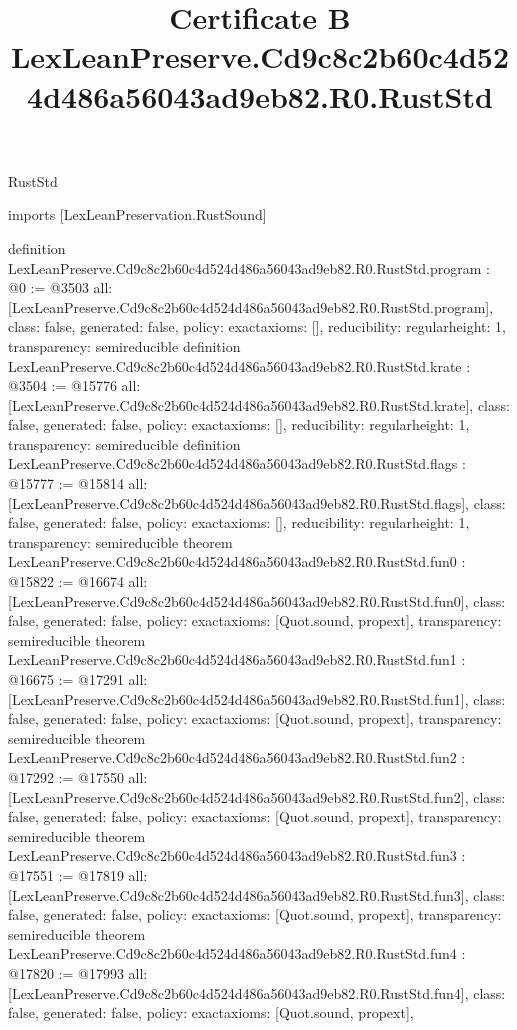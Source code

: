 \begin{lexlean}{RustStd}
\title{Certificate B LexLeanPreserve.Cd9c8c2b60c4d524d486a56043ad9eb82.R0.RustStd}
\begin{coremodule}
imports [LexLeanPreservation.RustSound]

definition LexLeanPreserve.Cd9c8c2b60c4d524d486a56043ad9eb82.R0.RustStd.program : @0 := @3503 {
  all: [LexLeanPreserve.Cd9c8c2b60c4d524d486a56043ad9eb82.R0.RustStd.program],
  class: false,
  generated: false,
  policy: exact{axioms: []},
  reducibility: regular{height: 1},
  transparency: semireducible
}
definition LexLeanPreserve.Cd9c8c2b60c4d524d486a56043ad9eb82.R0.RustStd.krate : @3504 := @15776 {
  all: [LexLeanPreserve.Cd9c8c2b60c4d524d486a56043ad9eb82.R0.RustStd.krate],
  class: false,
  generated: false,
  policy: exact{axioms: []},
  reducibility: regular{height: 1},
  transparency: semireducible
}
definition LexLeanPreserve.Cd9c8c2b60c4d524d486a56043ad9eb82.R0.RustStd.flags : @15777 := @15814 {
  all: [LexLeanPreserve.Cd9c8c2b60c4d524d486a56043ad9eb82.R0.RustStd.flags],
  class: false,
  generated: false,
  policy: exact{axioms: []},
  reducibility: regular{height: 1},
  transparency: semireducible
}
theorem LexLeanPreserve.Cd9c8c2b60c4d524d486a56043ad9eb82.R0.RustStd.fun0 : @15822 := @16674 {
  all: [LexLeanPreserve.Cd9c8c2b60c4d524d486a56043ad9eb82.R0.RustStd.fun0],
  class: false,
  generated: false,
  policy: exact{axioms: [Quot.sound, propext]},
  transparency: semireducible
}
theorem LexLeanPreserve.Cd9c8c2b60c4d524d486a56043ad9eb82.R0.RustStd.fun1 : @16675 := @17291 {
  all: [LexLeanPreserve.Cd9c8c2b60c4d524d486a56043ad9eb82.R0.RustStd.fun1],
  class: false,
  generated: false,
  policy: exact{axioms: [Quot.sound, propext]},
  transparency: semireducible
}
theorem LexLeanPreserve.Cd9c8c2b60c4d524d486a56043ad9eb82.R0.RustStd.fun2 : @17292 := @17550 {
  all: [LexLeanPreserve.Cd9c8c2b60c4d524d486a56043ad9eb82.R0.RustStd.fun2],
  class: false,
  generated: false,
  policy: exact{axioms: [Quot.sound, propext]},
  transparency: semireducible
}
theorem LexLeanPreserve.Cd9c8c2b60c4d524d486a56043ad9eb82.R0.RustStd.fun3 : @17551 := @17819 {
  all: [LexLeanPreserve.Cd9c8c2b60c4d524d486a56043ad9eb82.R0.RustStd.fun3],
  class: false,
  generated: false,
  policy: exact{axioms: [Quot.sound, propext]},
  transparency: semireducible
}
theorem LexLeanPreserve.Cd9c8c2b60c4d524d486a56043ad9eb82.R0.RustStd.fun4 : @17820 := @17993 {
  all: [LexLeanPreserve.Cd9c8c2b60c4d524d486a56043ad9eb82.R0.RustStd.fun4],
  class: false,
  generated: false,
  policy: exact{axioms: [Quot.sound, propext]},
}
\end{coremodule}
\end{lexlean}
